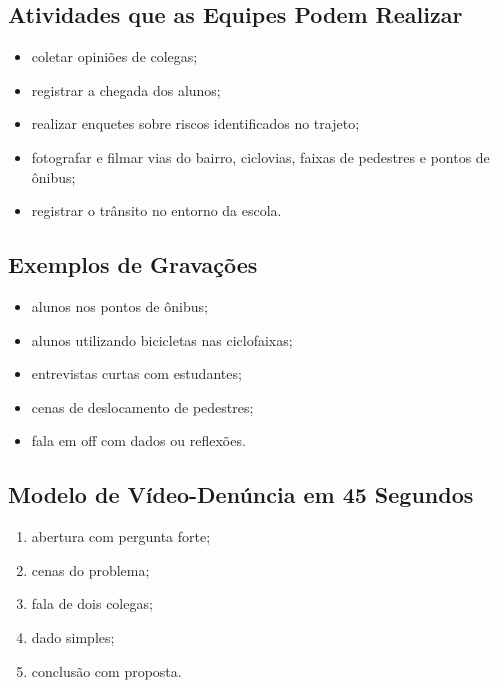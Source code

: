 \documentclass[
  letterpaper,
  DIV=11,
  numbers=noendperiod]{scrreport}
\providecommand{\tightlist}{%
  \setlength{\itemsep}{0pt}\setlength{\parskip}{0pt}}
\begin{document}
\subsection{Atividades que as Equipes Podem
Realizar}\label{atividades-que-as-equipes-podem-realizar}

\begin{itemize}
\tightlist
\item
  coletar opiniões de colegas;
\item
  registrar a chegada dos alunos;
\item
  realizar enquetes sobre riscos identificados no trajeto;
\item
  fotografar e filmar vias do bairro, ciclovias, faixas de pedestres e
  pontos de ônibus;
\item
  registrar o trânsito no entorno da escola.
\end{itemize}

\subsection{Exemplos de Gravações}\label{exemplos-de-gravauxe7uxf5es}

\begin{itemize}
\tightlist
\item
  alunos nos pontos de ônibus;
\item
  alunos utilizando bicicletas nas ciclofaixas;
\item
  entrevistas curtas com estudantes;
\item
  cenas de deslocamento de pedestres;
\item
  fala em off com dados ou reflexões.
\end{itemize}

\subsection{Modelo de Vídeo-Denúncia em 45
Segundos}\label{modelo-de-vuxeddeo-denuxfancia-em-45-segundos}

\begin{enumerate}
\def\labelenumi{\arabic{enumi}.}
\tightlist
\item
  abertura com pergunta forte;
\item
  cenas do problema;
\item
  fala de dois colegas;
\item
  dado simples;
\item
  conclusão com proposta.
\end{enumerate}
\end{document}

